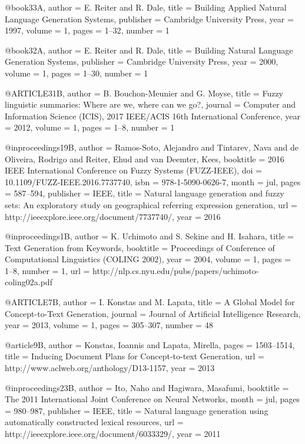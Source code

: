 @book{33A,
  author = {E. Reiter and R. Dale},
  title = {Building Applied Natural Language Generation Systems},
  publisher = {Cambridge University Press},
  year = {1997},
  volume = {1},
  pages = {1--32},
  number = {1}
}

@book{32A,
  author = {E. Reiter and R. Dale},
  title = {Building Natural Language Generation Systems},
  publisher = {Cambridge University Press},
  year = {2000},
  volume = {1},
  pages = {1--30},
  number = {1}
}

@ARTICLE{31B,
  author = {B. Bouchon-Meunier and G. Moyse},
  title = {Fuzzy linguistic summaries: Where are we, where can we go?},
  journal = {Computer and Information Science (ICIS), 2017 IEEE/ACIS 16th International Conference},
  year = {2012},
  volume = {1},
  pages = {1--8},
  number = {1}
}

@inproceedings{19B,
author = {Ramos-Soto, Alejandro and Tintarev, Nava and de Oliveira, Rodrigo and Reiter, Ehud and van Deemter, Kees},
booktitle = {2016 IEEE International Conference on Fuzzy Systems (FUZZ-IEEE)},
doi = {10.1109/FUZZ-IEEE.2016.7737740},
isbn = {978-1-5090-0626-7},
month = {jul},
pages = {587--594},
publisher = {IEEE},
title = {{Natural language generation and fuzzy sets: An exploratory study on geographical referring expression generation}},
url = {http://ieeexplore.ieee.org/document/7737740/},
year = {2016}
}

@inproceedings{1B,
  author = {K. Uchimoto and S. Sekine and H. Isahara},
  title = {Text Generation from Keywords},
  booktitle = {Proceedings of Conference of Computational Linguistics (COLING 2002)},
  year = {2004},
  volume = {1},
  pages = {1--8},
  number = {1},
  url = {http://nlp.cs.nyu.edu/pubs/papers/uchimoto-coling02a.pdf}
}

@ARTICLE{7B,
  author = {I. Konstas and M. Lapata},
  title = {A Global Model for Concept-to-Text Generation},
  journal = {Journal of Artificial Intelligence Research},
  year = {2013},
  volume = {1},
  pages = {305--307},
  number = {48}
}

@article{9B,
author = {Konstas, Ioannis and Lapata, Mirella},
pages = {1503--1514},
title = {Inducing Document Plans for Concept-to-text Generation},
url = {http://www.aclweb.org/anthology/D13-1157},
year = {2013}
}

@inproceedings{23B,
author = {Ito, Naho and Hagiwara, Masafumi},
booktitle = {The 2011 International Joint Conference on Neural Networks},
month = {jul},
pages = {980--987},
publisher = {IEEE},
title = {Natural language generation using automatically constructed lexical resources},
url = {http://ieeexplore.ieee.org/document/6033329/},
year = {2011}
}

